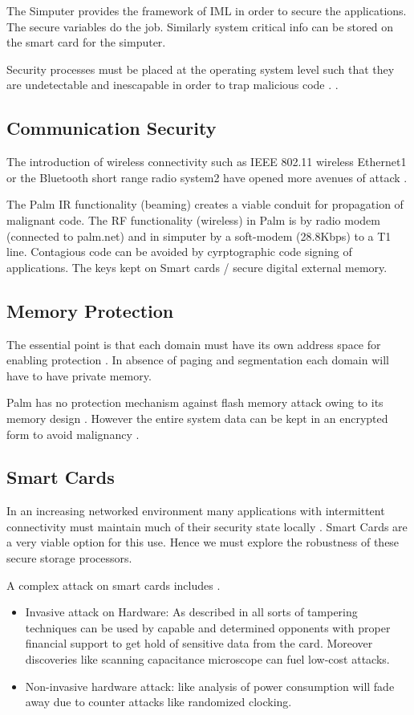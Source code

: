 \documentclass[11pt]{article}
\begin{document}
The Simputer provides the framework of IML in order to secure the applications. The secure variables do the job. Similarly system critical info can be stored on the smart card for the simputer.

Security processes must be placed at the operating system level such that they are undetectable and inescapable in order to trap malicious code \cite{mudge01}.
.
\subsection{Communication Security}
The introduction of wireless connectivity such as IEEE 802.11 wireless Ethernet1 or the Bluetooth short range radio system2 have opened more avenues of attack \cite{pocketpc}.

The  Palm IR functionality (beaming) creates a viable conduit for propagation of malignant code. The RF functionality (wireless) in Palm is by radio modem (connected to palm.net) and in simputer by a soft-modem (28.8Kbps) to a T1 line. Contagious code can be avoided by cyrptographic code signing of applications. The keys kept on Smart cards / secure digital external memory.

\subsection{Memory Protection}
The essential point is that each domain must have its own address space for enabling protection \cite{lamp71}. In absence of paging and segmentation each domain will have to have private memory.

Palm has no protection mechanism against flash memory attack owing to its memory design \cite{mudge01}. However the entire system data can be kept in an encrypted form to avoid malignancy \cite{pocketpc}.

\subsection{Smart Cards}
In an increasing networked environment many applications with intermittent connectivity must maintain much of their security state locally \cite{rosstalk}. Smart Cards are a very viable option for this use. Hence we must explore the robustness of these secure storage processors.

A complex attack on smart cards includes  \cite{ross01}.
\begin{itemize}
\item Invasive attack on Hardware: As described in \cite{ross01} all sorts of tampering techniques can be used by capable and determined  opponents with proper financial support to get hold of sensitive data from the card. Moreover discoveries like scanning capacitance microscope can fuel low-cost attacks.
\item Non-invasive hardware attack: like analysis of power consumption will fade away due to counter attacks like randomized clocking.
\end{itemize}
\end{document}
